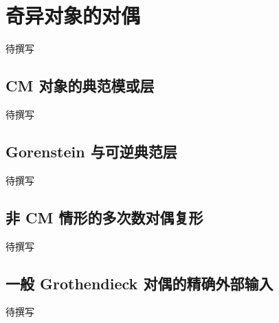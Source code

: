 
% 
% 
% 

\section{奇异对象的对偶}
\label{g5:sec:2204}

待撰写

\subsection{CM 对象的典范模或层}
\label{g5:subsec:2204:01}
待撰写

\subsection{Gorenstein 与可逆典范层}
\label{g5:subsec:2204:02}
待撰写

\subsection{非 CM 情形的多次数对偶复形}
\label{g5:subsec:2204:03}
待撰写

\subsection{一般 Grothendieck 对偶的精确外部输入}
\label{g5:subsec:2204:04}
待撰写
